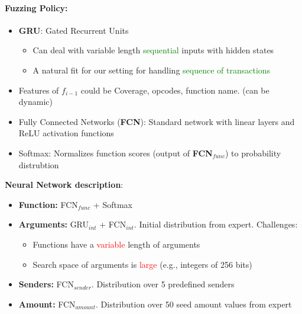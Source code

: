 \paragraph{Fuzzing Policy:\newline}
\begin{minipage}{0.5\linewidth}
    \centering      
    \def\svgwidth{\linewidth}
        
\end{minipage}
\begin{minipage}{0.5\linewidth}
    \centering      
    \def\svgwidth{\linewidth}
        
\end{minipage}
\begin{itemize}
    \item \textbf{GRU}: Gated Recurrent Units
    \begin{itemize}
        \item Can deal with variable length \textcolor{green}{sequential} inputs with hidden states
        \item A natural fit for our setting for handling \textcolor{green}{sequence of transactions}
    \end{itemize}{}
    \item Features of $f_{i-1}$ could be Coverage, opcodes, function name. (can be dynamic)
    \item Fully Connected Networks (\textbf{FCN}): Standard network with linear layers and ReLU activation functions
    \item Softmax: Normalizes function scores (output of \textbf{FCN$_{func}$}) to probability distrubtion
\end{itemize}{}
\textbf{Neural Network description}:

\begin{itemize}
    \item \textbf{Function: } FCN$_{func}$ + Softmax
    \item \textbf{Arguments: } GRU$_{int}$ + FCN$_{int}$. Initial distribution from expert. Challenges:
        \begin{itemize}
            \item Functions have a \textcolor{red}{variable} length of arguments
            \item Search space of arguments is \textcolor{red}{large} (e.g., integers of 256 bits)
        \end{itemize}{}
     \item \textbf{Senders: }  FCN$_{sender}$. Distribution over 5 predefined senders
      \item \textbf{Amount: }  FCN$_{amount}$. Distribution over 50 seed amount values from expert
\end{itemize}{}
